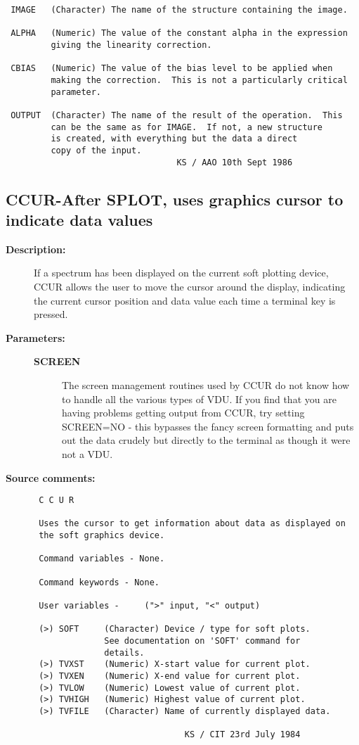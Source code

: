 \begin{description}
\begin{verbatim}
 IMAGE   (Character) The name of the structure containing the image.

 ALPHA   (Numeric) The value of the constant alpha in the expression
         giving the linearity correction.

 CBIAS   (Numeric) The value of the bias level to be applied when
         making the correction.  This is not a particularly critical
         parameter.

 OUTPUT  (Character) The name of the result of the operation.  This
         can be the same as for IMAGE.  If not, a new structure
         is created, with everything but the data a direct
         copy of the input.
                                  KS / AAO 10th Sept 1986
\end{verbatim}
\end{description}
\subsection{CCUR-\label{CCUR}After SPLOT, uses graphics cursor to indicate data values}
\begin{description}

\item [{\bf Description:}]
 If a spectrum has been displayed on the current soft plotting
 device, CCUR allows the user to move the cursor around the
 display, indicating the current cursor position and data value
 each time a terminal key is pressed.

\item [{\bf Parameters:}]
\begin{description}
\item [{\bf SCREEN}]
 The screen management routines used by CCUR do not know
 how to handle all the various types of VDU.  If you
 find that you are having problems getting output from
 CCUR, try setting SCREEN=NO - this bypasses the fancy
 screen formatting and puts out the data crudely but
 directly to the terminal as though it were not a VDU.
\end{description}

\item [{\bf Source comments:}]
\begin{verbatim}
 C C U R

 Uses the cursor to get information about data as displayed on
 the soft graphics device.

 Command variables - None.

 Command keywords - None.

 User variables -     (">" input, "<" output)

 (>) SOFT     (Character) Device / type for soft plots.
              See documentation on 'SOFT' command for
              details.
 (>) TVXST    (Numeric) X-start value for current plot.
 (>) TVXEN    (Numeric) X-end value for current plot.
 (>) TVLOW    (Numeric) Lowest value of current plot.
 (>) TVHIGH   (Numeric) Highest value of current plot.
 (>) TVFILE   (Character) Name of currently displayed data.

                              KS / CIT 23rd July 1984
\end{verbatim}
\end{description}

